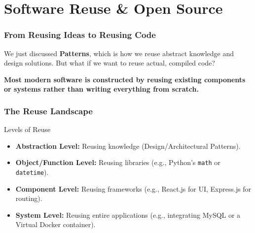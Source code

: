 \documentclass[xcolor=table]{beamer}
\begin{document}
\section{Software Reuse \& Open Source}

\begin{frame}
    \frametitle{From Reusing Ideas to Reusing Code}
    We just discussed \textbf{Patterns}, which is how we reuse abstract knowledge and design solutions. But what if we want to reuse actual, compiled code?
    
    \vspace{0.3cm}
    \textbf{Most modern software is constructed by reusing existing components or systems rather than writing everything from scratch.}
\end{frame}

\begin{frame}
    \frametitle{The Reuse Landscape}
    
    \begin{block}{Levels of Reuse}
        \begin{itemize}
            \item \textbf{Abstraction Level:} Reusing knowledge (Design/Architectural Patterns).
            \item \textbf{Object/Function Level:} Reusing libraries (e.g., Python's \texttt{math} or \texttt{datetime}).
            \item \textbf{Component Level:} Reusing frameworks (e.g., React.js for UI, Express.js for routing).
            \item \textbf{System Level:} Reusing entire applications (e.g., integrating MySQL or a Virtual Docker container).
        \end{itemize}
    \end{block}
\end{frame}
\end{document}
